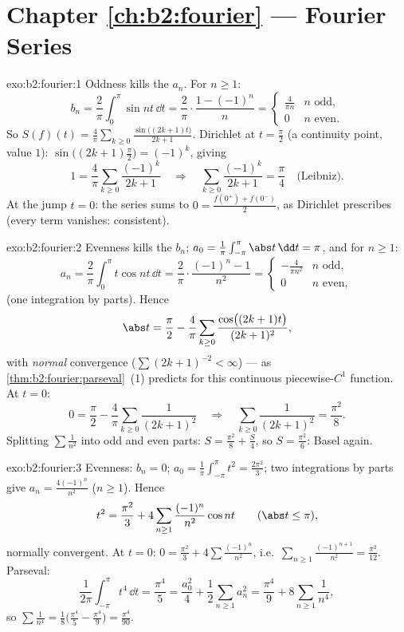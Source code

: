 \section*{Chapter \ref{ch:b2:fourier} --- Fourier Series}

\begin{solution}{exo:b2:fourier:1}
Oddness kills the $a_n$. For $n \geq 1$:
\[
b_n = \frac{2}{\pi}\int_0^{\pi} \sin nt\,\dd t
= \frac{2}{\pi}\cdot\frac{1 - (-1)^n}{n}
= \begin{cases} \frac{4}{\pi n} & n \text{ odd},\\ 0 & n
\text{ even}. \end{cases}
\]
So $S(f)(t) = \frac{4}{\pi}\sum_{k\geq0} \frac{\sin\bigl((2k+1)t
\bigr)}{2k+1}$. Dirichlet at $t = \frac\pi2$ (a continuity point,
value $1$): $\sin\bigl((2k+1)\frac\pi2\bigr) = (-1)^k$, giving
\[
1 = \frac4\pi \sum_{k\geq0}\frac{(-1)^k}{2k+1}
\quad\Longrightarrow\quad
\sum_{k\geq0}\frac{(-1)^k}{2k+1} = \frac{\pi}{4}
\quad\text{(Leibniz)}.
\]
At the jump $t = 0$: the series sums to $0 = \frac{f(0^+) +
f(0^-)}{2}$, as Dirichlet prescribes (every term vanishes:
consistent).
\end{solution}

\begin{solution}{exo:b2:fourier:2}
Evenness kills the $b_n$; $a_0 = \frac{1}{\pi}\int_{-\pi}^\pi\abs
t\,\dd t = \pi$, and for $n \geq 1$:
\[
a_n = \frac{2}{\pi}\int_0^\pi t\cos nt\,\dd t
= \frac{2}{\pi}\cdot\frac{(-1)^n - 1}{n^2}
= \begin{cases} -\frac{4}{\pi n^2} & n \text{ odd},\\ 0 & n
\text{ even}, \end{cases}
\]
(one integration by parts). Hence
\[
\abs t = \frac{\pi}{2} - \frac{4}{\pi}\sum_{k\geq0}
\frac{\cos\bigl((2k+1)t\bigr)}{(2k+1)^2} ,
\]
with \emph{normal} convergence ($\sum (2k+1)^{-2} < \infty$) --- as
\cref{thm:b2:fourier:parseval}~(1) predicts for this continuous
piecewise-$C^1$ function. At $t = 0$:
\[
0 = \frac\pi2 - \frac4\pi\sum_{k\geq0}\frac{1}{(2k+1)^2}
\quad\Longrightarrow\quad
\sum_{k\geq0}\frac{1}{(2k+1)^2} = \frac{\pi^2}{8} .
\]
Splitting $\sum \frac{1}{n^2}$ into odd and even parts: $S =
\frac{\pi^2}{8} + \frac S4$, so $S = \frac{\pi^2}{6}$: Basel again.
\end{solution}

\begin{solution}{exo:b2:fourier:3}
Evenness: $b_n = 0$; $a_0 = \frac{1}{\pi}\int_{-\pi}^{\pi} t^2 =
\frac{2\pi^2}{3}$; two integrations by parts give $a_n =
\frac{4(-1)^n}{n^2}$ ($n \geq 1$). Hence
\[
t^2 = \frac{\pi^2}{3} + 4\sum_{n\geq1}
\frac{(-1)^n}{n^2}\cos nt
\qquad (\abs t \leq \pi),
\]
normally convergent. At $t = 0$: $0 = \frac{\pi^2}{3} +
4\sum\frac{(-1)^n}{n^2}$, i.e.\ $\sum_{n\geq1}
\frac{(-1)^{n+1}}{n^2} = \frac{\pi^2}{12}$. Parseval:
\[
\frac{1}{2\pi}\int_{-\pi}^{\pi} t^4\,\dd t = \frac{\pi^4}{5}
= \frac{a_0^2}{4} + \frac12\sum_{n\geq1} a_n^2
= \frac{\pi^4}{9} + 8\sum_{n\geq1}\frac{1}{n^4} ,
\]
so $\sum \frac{1}{n^4} = \frac18\bigl(\frac{\pi^4}{5} -
\frac{\pi^4}{9}\bigr) = \frac{\pi^4}{90}$.
\end{solution}

